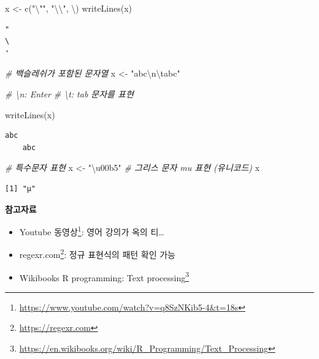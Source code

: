\documentclass[
  11pt,
]{krantz}
\makeatletter
\newenvironment{Shaded}{\begin{snugshade}}{\end{snugshade}}
\newcommand{\CommentTok}[1]{\textcolor[rgb]{0.37,0.37,0.37}{\textit{#1}}}
\newcommand{\FunctionTok}[1]{\textcolor[rgb]{0,0,0}{#1}}
\newcommand{\NormalTok}[1]{#1}
\newcommand{\OtherTok}[1]{\textcolor[rgb]{0.37,0.37,0.37}{#1}}
\newcommand{\SpecialCharTok}[1]{\textcolor[rgb]{0,0,0}{#1}}
\newcommand{\StringTok}[1]{\textcolor[rgb]{0.5,0.5,0.5}{#1}}
\providecommand{\tightlist}{%
  \setlength{\itemsep}{0pt}\setlength{\parskip}{0pt}}
\renewcommand{\href}[2]{#2\footnote{\url{#1}}}
\newenvironment{kframe}{%
\medskip{}
\setlength{\fboxsep}{.8em}
 \def\at@end@of@kframe{}%
 \ifinner\ifhmode%
  \def\at@end@of@kframe{\end{minipage}}%
  \begin{minipage}{\columnwidth}%
 \fi\fi%
 \def\FrameCommand##1{\hskip\@totalleftmargin \hskip-\fboxsep
 \colorbox{shadecolor}{##1}\hskip-\fboxsep
     \hskip-\linewidth \hskip-\@totalleftmargin \hskip\columnwidth}%
 \MakeFramed {\advance\hsize-\width
   \@totalleftmargin\z@ \linewidth\hsize
   \@setminipage}}%
 {\par\unskip\endMakeFramed%
 \at@end@of@kframe}
\newenvironment{rmdblock}[1]
  {
  \begin{itemize}
  \renewcommand{\labelitemi}{
    \raisebox{-.7\height}[0pt][0pt]{
      {\setkeys{Gin}{width=3em,keepaspectratio}\texttt{[image: images/\#1]}}
    }
  }
  \setlength{\fboxsep}{1em}
  \begin{kframe}
  \item
  }
  {
  \end{kframe}
  \end{itemize}
  }
\newenvironment{rmdtip}
  {\begin{rmdblock}{tip}}
  {\end{rmdblock}}
\makeatother
\begin{document}
\begin{Shaded}
\begin{Highlighting}[]
\NormalTok{x }\OtherTok{\textless{}{-}} \FunctionTok{c}\NormalTok{(}\StringTok{"}\SpecialCharTok{\textbackslash{}"}\StringTok{"}\NormalTok{, }\StringTok{"}\SpecialCharTok{\textbackslash{}\textbackslash{}}\StringTok{"}\NormalTok{, }\StringTok{\textquotesingle{}}\SpecialCharTok{\textbackslash{}\textquotesingle{}}\StringTok{\textquotesingle{}}\NormalTok{)}
\FunctionTok{writeLines}\NormalTok{(x)}
\end{Highlighting}
\end{Shaded}

\begin{verbatim}
"
\
'
\end{verbatim}

\begin{Shaded}
\begin{Highlighting}[]
\CommentTok{\# 백슬레쉬가 포함된 문자열}
\NormalTok{x }\OtherTok{\textless{}{-}} \StringTok{"abc}\SpecialCharTok{\textbackslash{}n\textbackslash{}t}\StringTok{abc"}

\CommentTok{\# \textbackslash{}n: Enter}
\CommentTok{\# \textbackslash{}t: tab 문자를 표현}

\FunctionTok{writeLines}\NormalTok{(x)}
\end{Highlighting}
\end{Shaded}

\begin{verbatim}
abc
    abc
\end{verbatim}

\begin{Shaded}
\begin{Highlighting}[]
\CommentTok{\# 특수문자 표현}
\NormalTok{x }\OtherTok{\textless{}{-}} \StringTok{"\textbackslash{}u00b5"} \CommentTok{\# 그리스 문자 mu 표현 (유니코드)}
\NormalTok{x}
\end{Highlighting}
\end{Shaded}

\begin{verbatim}
[1] "µ"
\end{verbatim}

\normalsize

\footnotesize

\begin{rmdtip}
\textbf{참고자료}

\begin{itemize}
\tightlist
\item
  \href{https://www.youtube.com/watch?v=q8SzNKib5-4\&t=18s}{Youtube 동영상}: 영어 강의가 옥의 티\ldots{}
\item
  \href{https://regexr.com}{regexr.com}: 정규 표현식의 패턴 확인 가능
\item
  \href{https://en.wikibooks.org/wiki/R_Programming/Text_Processing}{Wikibooks R programming: Text processing}
\end{itemize}
\end{rmdtip}
\end{document}
